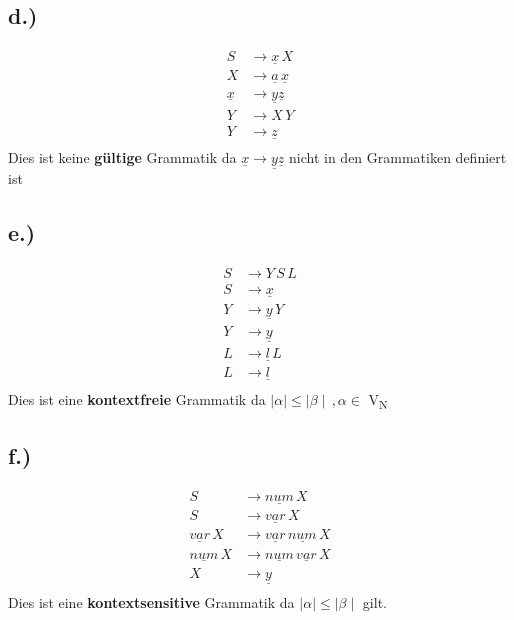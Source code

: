 \documentclass[12pt,runningheads,a4paper]{llncs}
\begin{document}
\subsection*{d.)}
\begin{align*}
S &\rightarrow \underline{x}\, X \\
X &\rightarrow \underline{a}\, \underline{x} \\
\underline{x} &\rightarrow \underline{y} \underline{z} \\
Y &\rightarrow X\, Y \\
Y &\rightarrow \underline{z}\\
\end{align*}
Dies ist keine \textbf{gültige} Grammatik da $\underline{x} \rightarrow      \underline{y} \underline{z}$ nicht in den Grammatiken definiert ist


\subsection*{e.)}
\begin{align*}
S &\rightarrow Y\, S \, L \\
S &\rightarrow \underline{x}\\
Y &\rightarrow \underline{y}\, Y \\
Y &\rightarrow \underline{y}\\
L &\rightarrow \underline{l}\, L\\
L &\rightarrow \underline{l}\\
\end{align*}
Dies ist eine \textbf{kontextfreie} Grammatik da  $\mid\alpha\mid \leq \mid\beta\mid\, , \alpha \in$ V\textsubscript{N}

\subsection*{f.)}
\begin{align*}
S &\rightarrow \underline{num}\, X \\
S &\rightarrow \underline{var}\, X \\
\underline{var}\, X &\rightarrow \underline{var}\,  \underline{num}\, X \\
\underline{num}\, X &\rightarrow \underline{num}\, \underline{var}\, X \\
X &\rightarrow \underline{y}\\
\end{align*}
Dies ist eine \textbf{kontextsensitive} Grammatik da $\mid\alpha\mid \leq \mid\beta\mid$ gilt.
\end{document}
